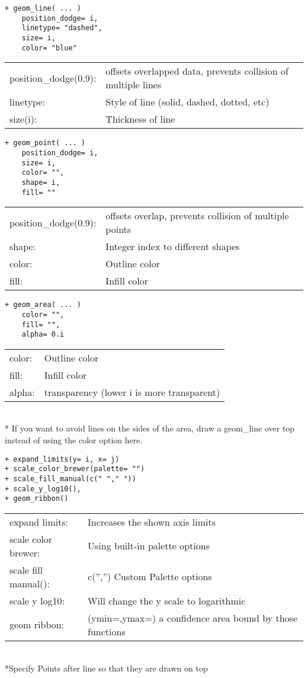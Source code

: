 \documentclass[]{article}
\begin{document}
\begin{verbatim}
+ geom_line( ... )
	position_dodge= i,
	linetype= "dashed",
	size= i,
	color= "blue"
\end{verbatim}
\begin{tabular}{l l}
	position\_dodge(0.9): & 
		offsets overlapped data, prevents collision of multiple lines \\
	linetype: & Style of line (solid, dashed, dotted, etc)\\
	size(i): & Thickness of line \\
\end{tabular}

\begin{verbatim}
+ geom_point( ... )
	position_dodge= i,
	size= i,
	color= "",
	shape= i,
	fill= ""
\end{verbatim}
\begin{tabular}{l l}
	position\_dodge(0.9): & offsets overlap, prevents collision of multiple points \\
	shape: & Integer index to different shapes \\
	color: & Outline color \\
	fill: & Infill color \\
\end{tabular}

\begin{verbatim}
+ geom_area( ... )
	color= "",
	fill= "",
	alpha= 0.i
\end{verbatim}
\begin{tabular}{l l}
	color: & Outline color \\
	fill: & Infill color \\
	alpha: & transparency (lower i is more transparent) \\
\end{tabular} \\
* If you want to avoid lines on the sides of the area, draw a geom\_line over top instead of using the color option here.

\begin{verbatim}
+ expand_limits(y= i, x= j)
+ scale_color_brewer(palette= "")
+ scale_fill_manual(c(" "," "))
+ scale_y_log10(),
+ geom_ribbon()
\end{verbatim}
\begin{tabular}{l l}
	expand limits: & Increases the shown axis limits \\
	scale color brewer: & Using built-in palette options \\
	scale fill manual(): & c('','') Custom Palette options \\
	scale y log10: & Will change the y scale to logarithmic \\
	geom ribbon: & (ymin=,ymax=) a confidence area bound by those functions \\
\end{tabular} \\
*Specify Points after line so that they are drawn on top
\end{document}

